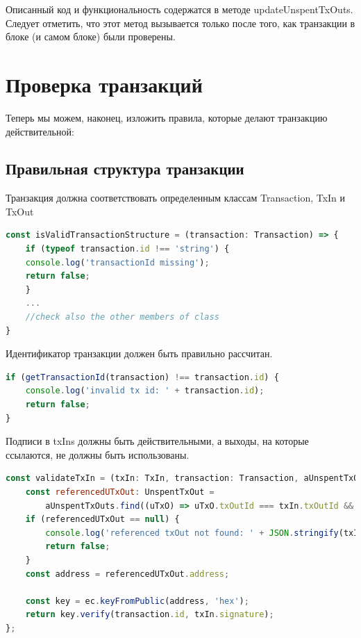 \documentclass{article}
\begin{document}
Описанный код и функциональность содержатся в методе updateUnspentTxOuts. Следует отметить, что этот метод вызывается только после того, как транзакции в блоке (и самом блоке) были проверены.


\section{Проверка транзакций}

Теперь мы можем, наконец, изложить правила, которые делают транзакцию действительной:

\subsection{Правильная структура транзакции}

Транзакция должна соответствовать определенным классам Transaction, TxIn и TxOut

\begin{lstlisting}[language=JavaScript, caption={Проверка структуры транзакции.}]
const isValidTransactionStructure = (transaction: Transaction) => {
	if (typeof transaction.id !== 'string') {
	console.log('transactionId missing');
	return false;
	}
	...
	//check also the other members of class
}
\end{lstlisting}

Идентификатор транзакции должен быть правильно рассчитан.

\begin{lstlisting}[language=JavaScript, caption={Проверка идентификатора транзакции.}]
if (getTransactionId(transaction) !== transaction.id) {
	console.log('invalid tx id: ' + transaction.id);
	return false;
}
\end{lstlisting}

Подписи в txIns должны быть действительными, а выходы, на которые ссылаются, не должны быть использованы.

\begin{lstlisting}[language=JavaScript, caption={Проверка входов транзакции.}]
const validateTxIn = (txIn: TxIn, transaction: Transaction, aUnspentTxOuts: UnspentTxOut[]): boolean => {
	const referencedUTxOut: UnspentTxOut =
		aUnspentTxOuts.find((uTxO) => uTxO.txOutId === txIn.txOutId && uTxO.txOutId === txIn.txOutId);
	if (referencedUTxOut == null) {
		console.log('referenced txOut not found: ' + JSON.stringify(txIn));
		return false;
	}
	const address = referencedUTxOut.address;
	
	const key = ec.keyFromPublic(address, 'hex');
	return key.verify(transaction.id, txIn.signature);
};
\end{lstlisting}
\end{document}
